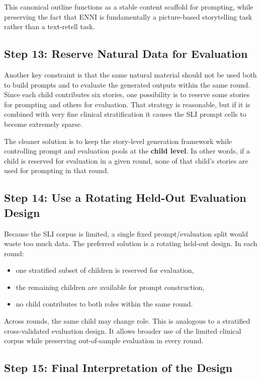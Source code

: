 This canonical outline functions as a stable content scaffold for prompting, while preserving the fact that ENNI is fundamentally a picture-based storytelling task rather than a text-retell task.

\subsection{Step 13: Reserve Natural Data for Evaluation}

Another key constraint is that the same natural material should not be used both to build prompts and to evaluate the generated outputs within the same round. Since each child contributes six stories, one possibility is to reserve some stories for prompting and others for evaluation. That strategy is reasonable, but if it is combined with very fine clinical stratification it causes the SLI prompt cells to become extremely sparse.

The cleaner solution is to keep the story-level generation framework while controlling prompt and evaluation pools at the \textbf{child level}. In other words, if a child is reserved for evaluation in a given round, none of that child's stories are used for prompting in that round.

\subsection{Step 14: Use a Rotating Held-Out Evaluation Design}

Because the SLI corpus is limited, a single fixed prompt/evaluation split would waste too much data. The preferred solution is a rotating held-out design. In each round:

\begin{itemize}
    \item one stratified subset of children is reserved for evaluation,
    \item the remaining children are available for prompt construction,
    \item no child contributes to both roles within the same round.
\end{itemize}

Across rounds, the same child may change role. This is analogous to a stratified cross-validated evaluation design. It allows broader use of the limited clinical corpus while preserving out-of-sample evaluation in every round.

\subsection{Step 15: Final Interpretation of the Design}

